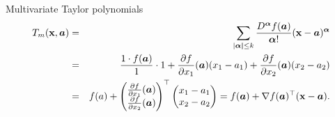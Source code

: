 \begin{vbframe}{Multivariate Taylor polynomials}
\begin{eqnarray*}
  T_m(\mathbf{x},\bm{a}) &=& \sum_{|\bm{\alpha|} \le k} \frac{D^{\bm\alpha} f(\bm{a})}{\bm{\alpha}!} (\mathbf{x} - \bm{a})^{\bm{\alpha}} \\ &=& \frac{1 \cdot f(\bm{a})}{1} \cdot 1 + \frac{\partial f}{\partial x_1}(\bm{a}) (x_1 - a_1) + \frac{\partial f}{\partial x_2}(\bm{a}) (x_2 - a_2) \\
  &=& f(a) + \begin{pmatrix} \frac{\partial f}{\partial x_1} (\bm{a})\\ \frac{\partial f}{\partial x_2}(\bm{a})\end{pmatrix}^\top \begin{pmatrix} x_1 - a_1 \\ x_2 - a_2\end{pmatrix} = f(\bm{a}) + \nabla f(\bm{a})^\top (\mathbf{x} - \bm{a}). 
\end{eqnarray*}


\end{vbframe}



  \endlecture
